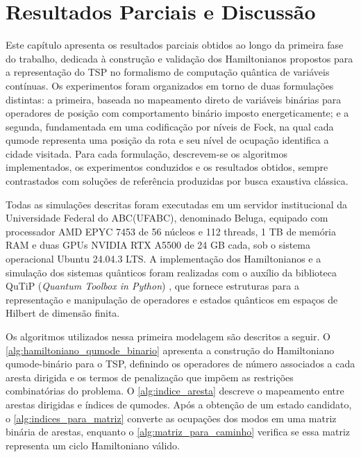 \chapter{Resultados Parciais e Discussão}\label{cap:resultados}

    Este capítulo apresenta os resultados parciais obtidos ao longo da primeira fase do trabalho, dedicada à construção e validação dos Hamiltonianos propostos para a representação do TSP no formalismo de computação quântica de variáveis contínuas. Os experimentos foram organizados em torno de duas formulações distintas: a primeira, baseada no mapeamento direto de variáveis binárias para operadores de posição com comportamento binário imposto energeticamente; e a segunda, fundamentada em uma codificação por níveis de Fock, na qual cada qumode representa uma posição da rota e seu nível de ocupação identifica a cidade visitada. Para cada formulação, descrevem-se os algoritmos implementados, os experimentos conduzidos e os resultados obtidos, sempre contrastados com soluções de referência produzidas por busca exaustiva clássica.

    Todas as simulações descritas foram executadas em um servidor institucional da Universidade Federal do ABC(UFABC), denominado Beluga, equipado com processador AMD EPYC 7453 de 56 núcleos e 112 threads, 1 TB de memória RAM e duas GPUs NVIDIA RTX A5500 de 24 GB cada, sob o sistema operacional Ubuntu 24.04.3 LTS. A implementação dos Hamiltonianos e a simulação dos sistemas quânticos foram realizadas com o auxílio da biblioteca QuTiP (\textit{Quantum Toolbox in Python}) \cite{qutip5}, que fornece estruturas para a representação e manipulação de operadores e estados quânticos em espaços de Hilbert de dimensão finita. 

    Os algoritmos utilizados nessa primeira modelagem são descritos a seguir. O \autoref{alg:hamiltoniano_qumode_binario} apresenta a construção do Hamiltoniano qumode-binário para o TSP, definindo os operadores de número associados a cada aresta dirigida e os termos de penalização que impõem as restrições combinatórias do problema. O \autoref{alg:indice_aresta} descreve o mapeamento entre arestas dirigidas e índices de qumodes. Após a obtenção de um estado candidato, o \autoref{alg:indices_para_matriz} converte as ocupações dos modos em uma matriz binária de arestas, enquanto o \autoref{alg:matriz_para_caminho} verifica se essa matriz representa um ciclo Hamiltoniano válido.

